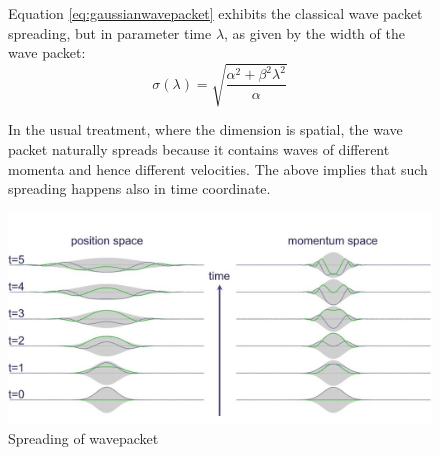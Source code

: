 \documentclass[a4paper,10pt]{article}
\numberwithin{equation}{section}
\begin{document}
\begin{figure}[H]
  \centering
  \begin{minipage}[H]{0.49\textwidth}
    \justify
Equation \ref{eq:gaussianwavepacket} exhibits the classical wave packet spreading, but in parameter time $\lambda$, as given by the width of the wave packet:
\begin{equation}
    \sigma(\lambda) = \sqrt{\frac{ \alpha^2 + \beta^2 \lambda^2}{ \alpha}}
    \label{eq:spreadingwidth}
\end{equation}

In the usual treatment, where the dimension is spatial, the wave packet naturally spreads because it contains waves of different momenta and hence different velocities. The above implies that such spreading happens also in time coordinate.

  \end{minipage}
  \hfill
  \begin{minipage}[H]{0.49\textwidth}
    \centering
    \includegraphics[width=1.0\textwidth]{Pics/position_spread.jpg}
    \caption{Spreading of wavepacket}
    \label{picpositionspread}
\end{minipage}
\end{figure}
\end{document}
